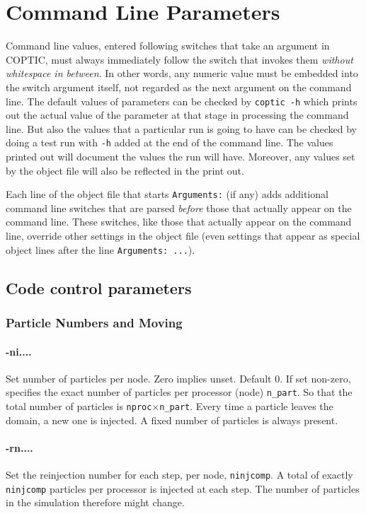 \documentclass[12pt]{article}
\begin{document}
\section{Command Line Parameters}\label{cmdline}

Command line values, entered following switches that take an argument
in COPTIC, must always immediately follow the switch that invokes them
\emph{without whitespace in between}. In other words, any numeric
value must be embedded into the switch argument itself, not regarded
as the next argument on the command line.  The default values of
parameters can be checked by \verb!coptic -h! which prints out the
actual value of the parameter at that stage in processing the command
line. But also the values that a particular run is going to have can
be checked by doing a test run with \verb!-h! added at the end of the
command line. The values printed out will document the values the run
will have. Moreover, any values set by the object file will also be
reflected in the print out.

Each line of the object file that starts \verb!Arguments:! (if any)
adds additional command line switches that are parsed \emph{before}
those that actually appear on the command line.  These switches, like
those that actually appear on the command line, override other
settings in the object file (even settings that appear as special
object lines after the line
\verb!Arguments: ...!).

\subsection{Code control parameters}

\subsubsection*{Particle Numbers and Moving}

\paragraph{-ni....} Set number of particles per node. Zero implies
unset. Default 0.
If set non-zero, specifies the exact number of particles per processor
(node) \verb!n_part!. So that the total number of particles is \verb!nproc!$\times$\verb!n_part!. Every time a particle leaves the domain, a new one is
injected. A fixed number of particles is always present.

\paragraph{-rn....} Set the reinjection number for each step, per
node, \verb!ninjcomp!. 
A total of exactly \verb!ninjcomp! particles per processor is injected
at each step. The number of particles in the simulation therefore
might change.
\end{document}
